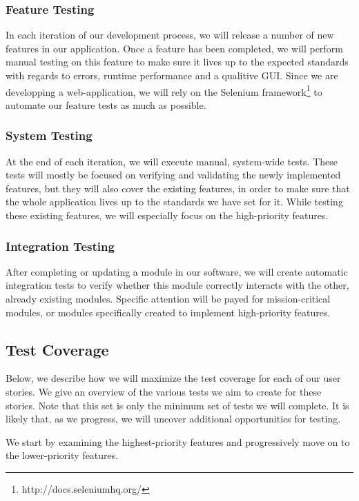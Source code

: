 \documentclass {article}
\begin{document}
\subsubsection*{Feature Testing}
In each iteration of our development process, we will release a number of new
features in our application. Once a feature has been completed, we will perform
manual testing on this feature to make sure it lives up to the expected
standards with regards to errors, runtime performance and a qualitive GUI.
Since we are developping a web-application, we will rely on the Selenium
framework\footnote{http://docs.seleniumhq.org/} to automate our feature tests as
much as possible.

\subsubsection*{System Testing}
At the end of each iteration, we will execute manual, system-wide tests. These
tests will mostly be focused on verifying and validating the newly implemented
features, but they will also cover the existing features, in order to make sure
that the whole application lives up to the standards we have set for it.  While
testing these existing features, we will especially focus on the high-priority
features.

\subsubsection*{Integration Testing}
After completing or updating a module in our software, we will create automatic
integration tests to verify whether this module correctly interacts with the
other, already existing modules. Specific attention will be payed for
mission-critical modules, or modules specifically created to implement
high-priority features.

\subsection{Test Coverage}
Below, we describe how we will maximize the test coverage for each of our user
stories. We give an overview of the various tests we aim to create for these
stories.  Note that this set is only the minimum set of tests we will
complete. It is likely that, as we progress, we will uncover additional
opportunities for testing.

We start by examining the highest-priority features and progressively move on to
the lower-priority features.
\end{document}
